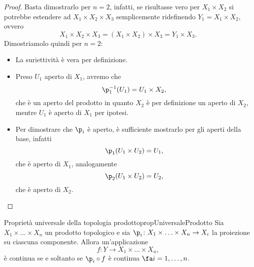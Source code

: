 \begin{proof}
	Basta dimostrarlo per \(n=2\), infatti, se risultasse vero per \(X_1 \times X_2\) si potrebbe estendere ad \(X_1 \times X_2 \times X_3\) semplicemente ridefinendo \(Y_1 = X_1 \times X_2\), ovvero
	\[
		X_1 \times X_2 \times X_3 = (X_1 \times X_2) \times X_3 = Y_1 \times X_3.
	\]
	Dimostriamolo quindi per \(n=2\):
	\begin{itemize}
		\item La suriettività è vera per definizione.
		\item Preso \(U_1\) aperto di \(X_1\), avremo che
		      \[
			      \p_1^{-1}(U_1)=U_1 \times X_2,
		      \]
		      che è un aperto del prodotto in quanto \(X_2\) è per definizione un aperto di \(X_2\), mentre \(U_1\) è aperto di \(X_1\) per ipotesi.
		\item Per dimostrare che \(\p_i\) è aperto, è sufficiente mostrarlo per gli aperti della base, infatti
		      \[
			      \p_1(U_1 \times U_2) = U_1,
		      \]
		      che è aperto di \(X_1\), analogamente
		      \[
			      \p_2(U_1 \times U_2) = U_2,
		      \]
		      che è aperto di \(X_2\).\qedhere
	\end{itemize}
\end{proof}
%
%
\begin{teor}{Proprietà universale della topologia prodotto}{propUniversaleProdotto}
	Sia \(X_1 \times \ldots \times X_n\) un prodotto topologico e sia \(\p_i \colon X_1 \times \ldots \times X_n \to X_i\) la proiezione su ciascuna componente.
	Allora un'applicazione
	\[
		f \colon Y \to X_1 \times \ldots \times X_n,
	\]
	è continua se e soltanto se \(\p_i \circ f\) è continua \(\fa i=1,\ldots,n\).
\end{teor}

